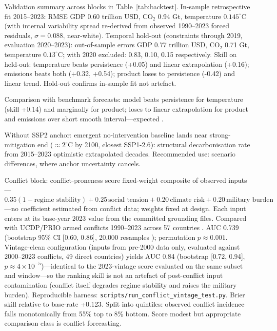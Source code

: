 \documentclass[a4paper,fleqn]{cas-sc}
\begin{document}
Validation summary across blocks in Table~\ref{tab:backtest}. In-sample retrospective fit 2015--2023: RMSE GDP 0.60 trillion USD, CO${}_2$ 0.94 Gt, temperature $0.145^{\circ}$C (with internal variability spread re-derived from observed 1990--2023 forced residuals, $\sigma=0.088$, near-white). Temporal hold-out (constraints through 2019, evaluation 2020--2023): out-of-sample errors GDP 0.77 trillion USD, CO${}_2$ 0.71 Gt, temperature $0.13^{\circ}$C; with 2020 excluded: 0.83, 0.10, 0.15 respectively. Skill on held-out: temperature beats persistence (+0.05) and linear extrapolation (+0.16); emissions beats both (+0.32, +0.54); product loses to persistence (-0.42) and linear trend. Hold-out confirms in-sample fit not artefact.

Comparison with benchmark forecasts: model beats persistence for temperature (skill +0.14) and marginally for product; loses to linear extrapolation for product and emissions over short smooth interval---expected \citep{celasun2021}.

Without SSP2 anchor: emergent no-intervention baseline lands near strong-mitigation end (${\approx}2^{\circ}$C by 2100, closest SSP1-2.6): structural decarbonisation rate from 2015--2023 optimistic extrapolated decades. Recommended use: scenario differences, where anchor uncertainty cancels.

Conflict block: conflict-proneness score fixed-weight composite of observed inputs---$0.35(1-\text{regime stability}) + 0.25\,\text{social tension} + 0.20\,\text{climate risk} + 0.20\,\text{military burden}$---no coefficient estimated from conflict data; weights fixed at design. Each input enters at its base-year 2023 value from the committed grounding files. Compared with UCDP/PRIO armed conflicts 1990--2023 across 57 countries \citep{sundberg2013}. AUC 0.739 (bootstrap 95\% CI [0.60, 0.86], 20,000 resamples \citep{efron1993}); permutation $p\approx0.001$. Vintage-clean configuration (inputs from pre-2000 data only, evaluated against 2000--2023 conflicts, 49 direct countries) yields AUC 0.84 (bootstrap [0.72, 0.94], $p\approx4\times10^{-5}$)---identical to the 2023-vintage score evaluated on the same subset and window---so the ranking skill is not an artefact of post-conflict input contamination (conflict itself degrades regime stability and raises the military burden). Reproducible harness: \texttt{scripts/run\_conflict\_vintage\_test.py}. Brier skill relative to base-rate +0.123. Split into quintiles: observed conflict incidence falls monotonically from 55\% top to 8\% bottom. Score modest but appropriate comparison class is conflict forecasting.
\end{document}
